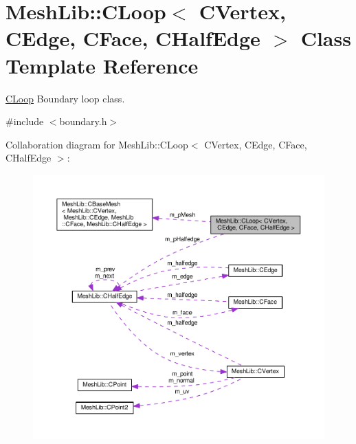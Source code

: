 \hypertarget{class_mesh_lib_1_1_c_loop}{}\section{Mesh\+Lib\+:\+:C\+Loop$<$ C\+Vertex, C\+Edge, C\+Face, C\+Half\+Edge $>$ Class Template Reference}
\label{class_mesh_lib_1_1_c_loop}


\hyperlink{class_mesh_lib_1_1_c_loop}{C\+Loop} Boundary loop class.  




{\ttfamily \#include $<$boundary.\+h$>$}



Collaboration diagram for Mesh\+Lib\+:\+:C\+Loop$<$ C\+Vertex, C\+Edge, C\+Face, C\+Half\+Edge $>$\+:
\nopagebreak
\begin{figure}[H]
\begin{center}
\leavevmode
\includegraphics[width=350pt]{class_mesh_lib_1_1_c_loop__coll__graph}
\end{center}
\end{figure}
